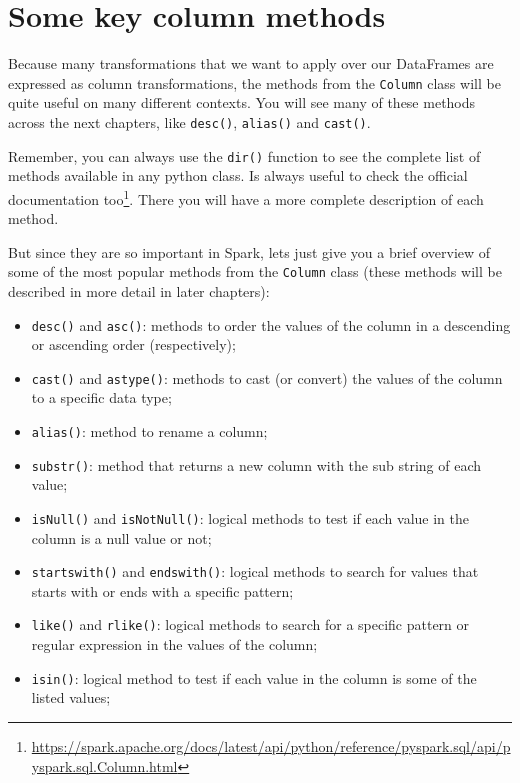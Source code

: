 \documentclass[
  11pt,
  letterpaper,
  DIV=11,
  numbers=noendperiod]{scrreprt}
\providecommand{\tightlist}{%
  \setlength{\itemsep}{0pt}\setlength{\parskip}{0pt}}\usepackage{longtable,booktabs,array}
\begin{document}
\hypertarget{some-key-column-methods}{%
\section{Some key column methods}\label{some-key-column-methods}}

Because many transformations that we want to apply over our DataFrames
are expressed as column transformations, the methods from the
\texttt{Column} class will be quite useful on many different contexts.
You will see many of these methods across the next chapters, like
\texttt{desc()}, \texttt{alias()} and \texttt{cast()}.

Remember, you can always use the \texttt{dir()} function to see the
complete list of methods available in any python class. Is always useful
to check the official documentation too\footnote{\url{https://spark.apache.org/docs/latest/api/python/reference/pyspark.sql/api/pyspark.sql.Column.html}}.
There you will have a more complete description of each method.

But since they are so important in Spark, lets just give you a brief
overview of some of the most popular methods from the \texttt{Column}
class (these methods will be described in more detail in later
chapters):

\begin{itemize}
\tightlist
\item
  \texttt{desc()} and \texttt{asc()}: methods to order the values of the
  column in a descending or ascending order (respectively);
\item
  \texttt{cast()} and \texttt{astype()}: methods to cast (or convert)
  the values of the column to a specific data type;
\item
  \texttt{alias()}: method to rename a column;
\item
  \texttt{substr()}: method that returns a new column with the sub
  string of each value;
\item
  \texttt{isNull()} and \texttt{isNotNull()}: logical methods to test if
  each value in the column is a null value or not;
\item
  \texttt{startswith()} and \texttt{endswith()}: logical methods to
  search for values that starts with or ends with a specific pattern;
\item
  \texttt{like()} and \texttt{rlike()}: logical methods to search for a
  specific pattern or regular expression in the values of the column;
\item
  \texttt{isin()}: logical method to test if each value in the column is
  some of the listed values;
\end{itemize}
\end{document}
